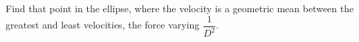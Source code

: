 Find that point in the ellipse, where the 
velocity is a geometric mean between the 
greatest and least velocities, the force
varying $\dfrac{1}{D^2}$.
